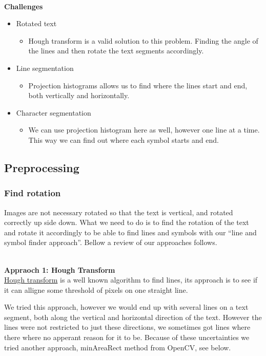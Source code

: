 \documentclass[11pt,a4paper,UKenglish]{article}
\begin{document}
\noindent \\ \textbf{Challenges}
\begin{itemize}
 \item{Rotated text}
 \begin{itemize}
  \item{Hough transform is a valid solution to this problem. Finding the angle
  of the lines and then rotate the text segments accordingly.}
 \end{itemize}
 \item{Line segmentation}
 \begin{itemize}
  \item{Projection histograms allows us to find where the lines start and end,
  both vertically and horizontally.}
 \end{itemize}
 \item{Character segmentation}
 \begin{itemize}
  \item{We can use projection histogram here as well, however one line at a
  time. This way we can find out where each symbol starts and end.}
 \end{itemize}
\end{itemize}


\subsection{Preprocessing}
\subsubsection{Find rotation}
Images are not necessary rotated so that the text is vertical, and rotated
correctly up side down. What we need to do is to find the rotation of the text
and rotate it accordingly to be able to find lines and symbols with our
``line and symbol finder approach''. Bellow a review of our approaches follows.

\noindent \\ \textbf{Appraoch 1: Hough Transform}
\noindent \\ \href{https://en.wikipedia.org/wiki/Hough_transform}{Hough transform} is a well known algorithm to find lines, its
approach is to see if it can alligne some threshold of pixels on one straight
line. \par
We tried this approach, however we would end up with several lines on a text
segment, both along the vertical and horizontal direction of the text. However
the lines were not restricted to just these directions, we sometimes got lines
where there where no apperant reason for it to be. Because of these
uncertainties we tried another approach, minAreaRect method from OpenCV, see
below.
\end{document}
